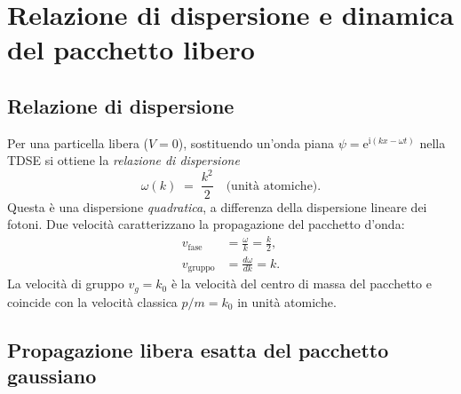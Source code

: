 \documentclass[12pt, a4paper]{article}
\newcommand{\ii}{\mathrm{i}}          %
\newcommand{\ee}{\mathrm{e}}          %
\begin{document}
\section{Relazione di dispersione e dinamica del pacchetto libero}
\label{app:dispersion}

\subsection{Relazione di dispersione}

Per una particella libera ($V=0$), sostituendo un'onda piana
$\psi = \ee^{\ii(kx - \omega t)}$ nella TDSE si ottiene la
\emph{relazione di dispersione}
\begin{equation}
  \omega(k) \;=\; \frac{k^2}{2} \quad \text{(unità atomiche)}.
\end{equation}
Questa è una dispersione \emph{quadratica}, a differenza della
dispersione lineare dei fotoni.  Due velocità caratterizzano la
propagazione del pacchetto d'onda:
\begin{align}
  v_\text{fase}  &= \frac{\omega}{k} = \frac{k}{2}, \\
  v_\text{gruppo} &= \frac{d\omega}{dk} = k.
\end{align}
La velocità di gruppo $v_g = k_0$ è la velocità del centro di massa
del pacchetto e coincide con la velocità classica $p/m = k_0$ in
unità atomiche.

\subsection{Propagazione libera esatta del pacchetto gaussiano}
\end{document}

